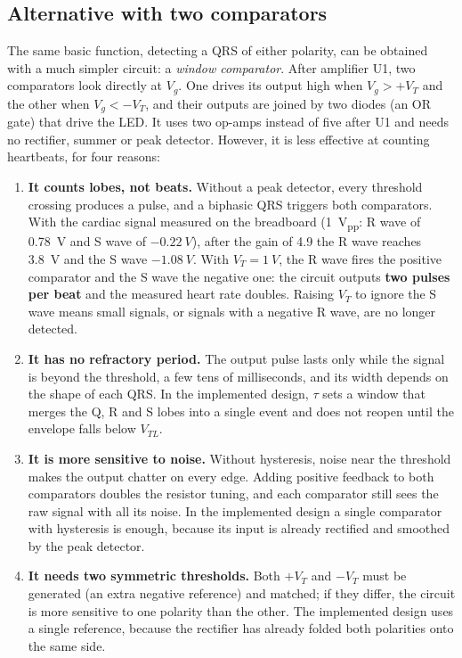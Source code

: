 \documentclass[11pt,letterpaper]{article}
\newcommand{\Vg}{V_g}
\newcommand{\VTL}{V_{TL}}
\begin{document}
\subsection{Alternative with two comparators}\label{sec:doscomp}

The same basic function, detecting a QRS of either polarity, can be obtained with a much simpler circuit: a \emph{window comparator}. After amplifier U1, two comparators look directly at $\Vg$. One drives its output high when $\Vg>+V_T$ and the other when $\Vg<-V_T$, and their outputs are joined by two diodes (an OR gate) that drive the LED. It uses two op-amps instead of five after U1 and needs no rectifier, summer or peak detector. However, it is less effective at counting heartbeats, for four reasons:

\begin{enumerate}
  \item \textbf{It counts lobes, not beats.} Without a peak detector, every threshold crossing produces a pulse, and a biphasic QRS triggers both comparators. With the cardiac signal measured on the breadboard (\SI{1}{V_{pp}}: R wave of \SI{0.78}{V} and S wave of $-\SI{0.22}{V}$), after the gain of 4.9 the R wave reaches \SI{3.8}{V} and the S wave $-\SI{1.08}{V}$. With $V_T=\SI{1}{V}$, the R wave fires the positive comparator and the S wave the negative one: the circuit outputs \textbf{two pulses per beat} and the measured heart rate doubles. Raising $V_T$ to ignore the S wave means small signals, or signals with a negative R wave, are no longer detected.
  \item \textbf{It has no refractory period.} The output pulse lasts only while the signal is beyond the threshold, a few tens of milliseconds, and its width depends on the shape of each QRS. In the implemented design, $\tau$ sets a window that merges the Q, R and S lobes into a single event and does not reopen until the envelope falls below $\VTL$.
  \item \textbf{It is more sensitive to noise.} Without hysteresis, noise near the threshold makes the output chatter on every edge. Adding positive feedback to both comparators doubles the resistor tuning, and each comparator still sees the raw signal with all its noise. In the implemented design a single comparator with hysteresis is enough, because its input is already rectified and smoothed by the peak detector.
  \item \textbf{It needs two symmetric thresholds.} Both $+V_T$ and $-V_T$ must be generated (an extra negative reference) and matched; if they differ, the circuit is more sensitive to one polarity than the other. The implemented design uses a single reference, because the rectifier has already folded both polarities onto the same side.
\end{enumerate}
\end{document}
